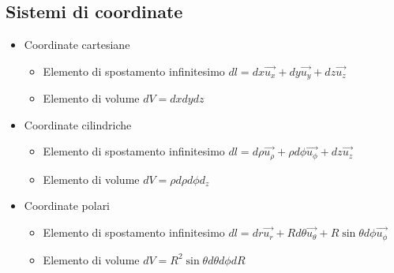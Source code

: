 \documentclass{article}
\begin{document}
\subsection{Sistemi di coordinate}
\begin{itemize}
	\item Coordinate cartesiane
	\begin{itemize}
		\item Elemento di spostamento infinitesimo \( dl = dx \vec{u_x} + dy \vec{u_y} + dz \vec{u_z} \)
		\item Elemento di volume \( dV = dx dy dz \)
	\end{itemize}
	
	\item Coordinate cilindriche
	\begin{itemize}
		\item Elemento di spostamento infinitesimo \( dl = d\rho \vec{u_\rho} + \rho d\phi \vec{u_\phi} + dz \vec{u_z} \)
		\item Elemento di volume \( dV = \rho d\rho d\phi d_z\)
	\end{itemize}
	
	\item Coordinate polari
	\begin{itemize}
		\item Elemento di spostamento infinitesimo \( dl = dr \vec{u_r} + R d\theta \vec{u_\theta} + R \sin\theta d\phi \vec{u_\phi} \)
		\item Elemento di volume \( dV = R^2 \sin\theta d\theta d\phi dR \)
	\end{itemize}
\end{itemize}
\end{document}
